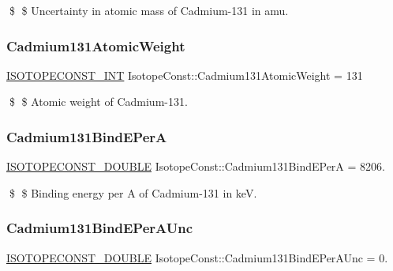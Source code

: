\$ \$ Uncertainty in atomic mass of Cadmium-\/131 in amu. \mbox{\label{group___isotope_const-_cadmium-_cd131_ga07798a4c875a1401957f59a539a32e03}} 
\subsubsection{\texorpdfstring{Cadmium131\+Atomic\+Weight}{Cadmium131AtomicWeight}}
{\footnotesize\ttfamily \mbox{\hyperlink{group___isotope_const-_macros_ga5f18360b3e99483a35c32d789e62621c}{I\+S\+O\+T\+O\+P\+E\+C\+O\+N\+S\+T\+\_\+\+I\+NT}} Isotope\+Const\+::\+Cadmium131\+Atomic\+Weight = 131}

\$ \$ Atomic weight of Cadmium-\/131. \mbox{\label{group___isotope_const-_cadmium-_cd131_ga6b37bce3c49955a274286eed33753fee}} 
\subsubsection{\texorpdfstring{Cadmium131\+Bind\+E\+PerA}{Cadmium131BindEPerA}}
{\footnotesize\ttfamily \mbox{\hyperlink{group___isotope_const-_macros_ga8f45a7272ce02c0b4c65c44636ed719a}{I\+S\+O\+T\+O\+P\+E\+C\+O\+N\+S\+T\+\_\+\+D\+O\+U\+B\+LE}} Isotope\+Const\+::\+Cadmium131\+Bind\+E\+PerA = 8206.}

\$ \$ Binding energy per A of Cadmium-\/131 in keV. \mbox{\label{group___isotope_const-_cadmium-_cd131_ga5d1b01329b17edce0129f41fbb02015c}} 
\subsubsection{\texorpdfstring{Cadmium131\+Bind\+E\+Per\+A\+Unc}{Cadmium131BindEPerAUnc}}
{\footnotesize\ttfamily \mbox{\hyperlink{group___isotope_const-_macros_ga8f45a7272ce02c0b4c65c44636ed719a}{I\+S\+O\+T\+O\+P\+E\+C\+O\+N\+S\+T\+\_\+\+D\+O\+U\+B\+LE}} Isotope\+Const\+::\+Cadmium131\+Bind\+E\+Per\+A\+Unc = 0.}

